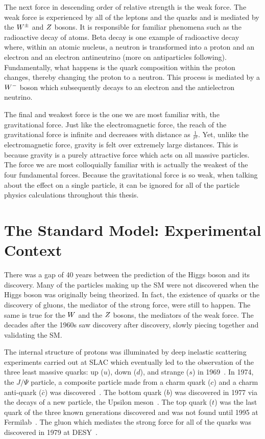 The next force in descending order of relative strength is the weak force.
The weak force is experienced by
all of the leptons and the quarks and is mediated by the $W^{\pm}$ and $Z$ 
bosons. It is responsible for familiar phenomena such as the radioactive decay of atoms. 
Beta decay is one example of radioactive decay where, within an atomic nucleus,
a neutron is transformed into a proton and an electron and an electron antineutrino
(more on antiparticles following). Fundamentally, what happens
is the quark composition within the proton changes, thereby changing the proton to a
neutron. This process is mediated by a $W^{-}$ boson which subsequently decays
to an electron and the antielectron neutrino.

The final and weakest force is the one we are most familiar with, the gravitational
force. Just like the electromagnetic force, the reach of the gravitational force 
is infinite and decreases with distance as $\frac{1}{r^{2}}$. Yet, unlike the
electromagnetic force, gravity is felt over extremely large distances. This is because
gravity is a purely attractive force which acts on all massive particles.
The force we are most colloquially familiar with is actually the
weakest of the four fundamental forces. Because the gravitational force is so weak,
when talking about the effect on a single particle, it can be ignored for
all of the particle physics calculations throughout this thesis.



\section{The Standard Model: Experimental Context}
There was a gap of 40 years between the prediction of the Higgs boson and its discovery.
Many of the particles making up the SM were not discovered when the Higgs boson
was originally being theorized. In fact, the existence of quarks or the discovery 
of gluons, the mediator of the strong force, were still to happen. The same is true
for the $W$ and the $Z$ bosons, the mediators of the weak force. The decades after the
1960s saw discovery after discovery, slowly piecing together and validating
the SM.

The internal structure of protons was illuminated by
deep inelastic scattering experiments carried out at SLAC which eventually led to 
the observation of the three least massive quarks: up ($u$), down ($d$), and strange ($s$)
in 1969~\cite{PhysRevLett.23.930,Breidenbach:1969kd}. In 1974, the $J/\Psi$ particle, a composite 
particle made from a charm quark ($c$) and a charm anti-quark ($\bar{c}$) was 
discovered~\cite{PhysRevLett.33.1404,PhysRevLett.33.1406}. 
The bottom quark ($b$) was discovered in 1977 via the decays of a new particle, the Upsilon
meson~\cite{PhysRevLett.39.252}. The top quark ($t$) was the last quark of the three
known generations discovered
and was not found until 1995 at Fermilab~\cite{PhysRevLett.74.2626,PhysRevLett.74.2632}.
The gluon which mediates the strong force for all of the quarks was discovered in 
1979 at DESY~\cite{PhysRevLett.43.830}.

